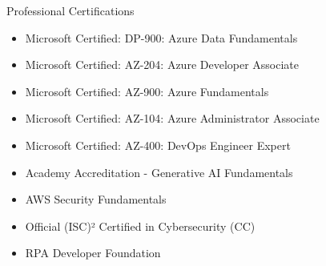 \documentclass{resume} %
\begin{document}
\begin{rSection}{Professional Certifications}
\begin{itemize}
    \item Microsoft Certified: DP-900: Azure Data Fundamentals
    \item Microsoft Certified: AZ-204: Azure Developer Associate
    \item Microsoft Certified: AZ-900: Azure Fundamentals
    \item Microsoft Certified: AZ-104: Azure Administrator Associate
    \item Microsoft Certified: AZ-400: DevOps Engineer Expert
    \item Academy Accreditation - Generative AI Fundamentals
    \item AWS Security Fundamentals
    \item Official (ISC)² Certified in Cybersecurity (CC)
    \item RPA Developer Foundation
\end{itemize}
\end{rSection}

\end{document}
